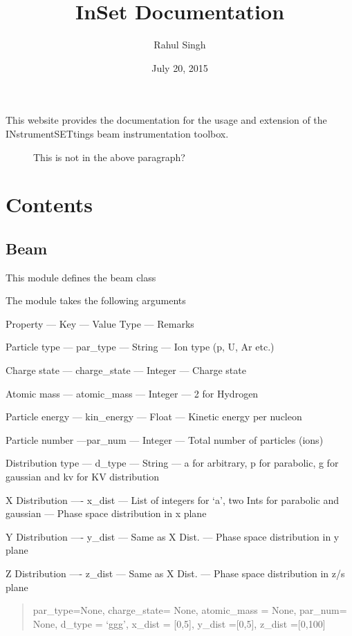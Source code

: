 \documentclass[letterpaper,10pt,english]{sphinxmanual}
\title{InSet Documentation}
\date{July 20, 2015}
\author{Rahul Singh}
\begin{document}
\maketitle
\tableofcontents
{}\label{index::doc}

\begin{description}
\item[{This website provides the documentation for the usage and extension of the INstrumentSETtings beam instrumentation toolbox.}] \leavevmode
This is not in the above paragraph?

\end{description}


\chapter{Contents}
\label{index:contents}\label{index:welcome-to-inset}\label{index:index-label}

\section{Beam}
\label{beam:beam-label}\label{beam::doc}\label{beam:beam}\label{beam:module-beam}
This module defines the beam class

The module takes the following arguments

Property --- Key --- Value Type --- Remarks

Particle type --- par\_type --- String --- Ion type (p, U, Ar etc.)

Charge state --- charge\_state --- Integer --- Charge state

Atomic mass --- atomic\_mass ---  Integer --- 2 for Hydrogen

Particle energy --- kin\_energy --- Float --- Kinetic energy per nucleon

Particle number ---par\_num --- Integer --- Total number of particles (ions)

Distribution type --- d\_type --- String --- a for arbitrary, p for parabolic, g for gaussian and kv for KV distribution

X Distribution ---- x\_dist --- List of integers for `a', two Ints for parabolic and gaussian --- Phase space distribution in x plane

Y Distribution ---- y\_dist --- Same as X Dist. --- Phase space distribution in y plane

Z Distribution ---- z\_dist --- Same as X Dist. --- Phase space distribution in z/s plane
\begin{quote}

par\_type=None, charge\_state= None, atomic\_mass = None, par\_num= None, d\_type = `ggg', x\_dist = {[}0,5{]}, y\_dist ={[}0,5{]}, z\_dist ={[}0,100{]}
\end{quote}
\end{document}
